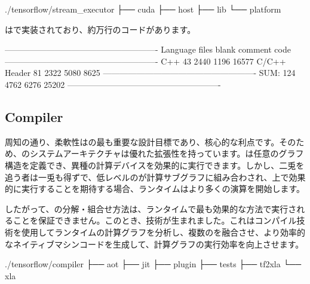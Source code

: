 \begin{content}
\begin{leftbar}
\begin{c++}[caption={StreamExecutorソースコード構造}]
./tensorflow/stream_executor
├── cuda
├── host
├── lib
└── platform
\end{c++}
\end{leftbar}

はで実装されており、約万行のコードがあります。

\begin{leftbar}
\begin{python}[caption={StreamExecutorコード統計}]
-------------------------------------------------------
Language            files     blank   comment      code
-------------------------------------------------------
C++                    43      2440      1196     16577
C/C++ Header           81      2322      5080      8625
-------------------------------------------------------
SUM:                  124      4762      6276     25202
-------------------------------------------------------
\end{python}
\end{leftbar}

\subsection{Compiler}

周知の通り、柔軟性は\tf{}の最も重要な設計目標であり、核心的な利点です。そのため、\tf{}のシステムアーキテクチャは優れた拡張性を持っています。\tf{}は任意のグラフ構造を定義でき、異種の計算デバイスを効果的に実行できます。しかし、二兎を追う者は一兎も得ずで、低レベルのが計算サブグラフに組み合わされ、上で効果的に実行することを期待する場合、ランタイムはより多くの演算を開始します。

したがって、\tf{}の分解・組合せ方法は、ランタイムで最も効果的な方法で実行されることを保証できません。このとき、技術が生まれました。これはコンパイル技術を使用してランタイムの計算グラフを分析し、複数のを融合させ、より効率的なネイティブマシンコードを生成して、計算グラフの実行効率を向上させます。

\begin{leftbar}
\begin{python}[caption={Compilerソースコード構造}]
./tensorflow/compiler
├── aot
├── jit
├── plugin
├── tests
├── tf2xla
└── xla
\end{python}
\end{leftbar}


\end{content}
